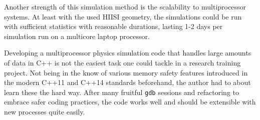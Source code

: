 \documentclass[a4paper,twoside,12pt]{article}
\begin{document}
Another strength of this simulation method is the scalability to multiprocessor
systems. At least with the used HIISI geometry, the simulations could be run
with sufficient statistics with reasonable durations, lasting 1-2 days per
simulation run on a multicore laptop processor.

Developing a multiprocessor physics simulation code that handles
large amounts of data in \textsc{C++} is not the easiest task one could tackle
in a research training project. Not being in the know of various
memory safety features introduced in the modern \textsc{C++11} and
\textsc{C++14} standards beforehand, the author had to about learn these the hard way.
After many fruitful \texttt{gdb} sessions and refactoring to embrace safer
coding practices, the code works well and should be extensible with
new processes quite easily.

\clearpage



\end{document}

